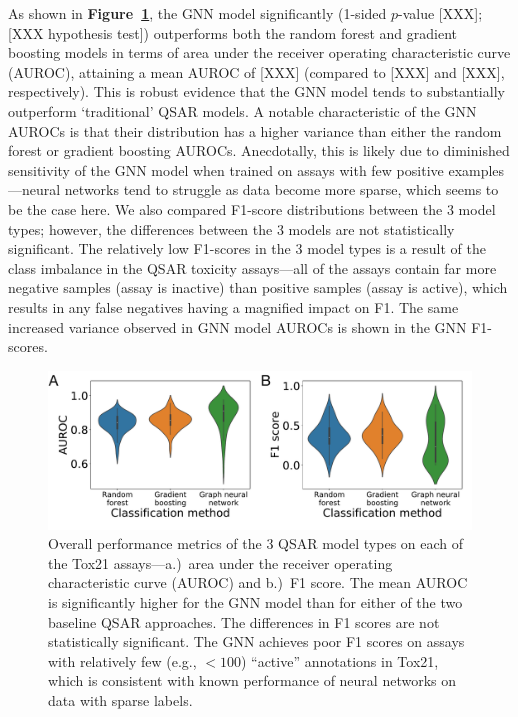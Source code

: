 \documentclass{ws-procs11x85}
\begin{document}
As shown in \textbf{Figure~\ref{fig:3}}, the GNN model significantly (1-sided $p$-value [XXX]; [XXX hypothesis test]) outperforms both the random forest and gradient boosting models in terms of area under the receiver operating characteristic curve (AUROC), attaining a mean AUROC of [XXX] (compared to [XXX] and [XXX], respectively).
This is robust evidence that the GNN model tends to substantially outperform `traditional' QSAR models.
A notable characteristic of the GNN AUROCs is that their distribution has a higher variance than either the random forest or gradient boosting AUROCs.
Anecdotally, this is likely due to diminished sensitivity of the GNN model when trained on assays with few positive examples---neural networks tend to struggle as data become more sparse, which seems to be the case here.
We also compared F1-score distributions between the 3 model types; however, the differences between the 3 models are not statistically significant.
The relatively low F1-scores in the 3 model types is a result of the class imbalance in the QSAR toxicity assays---all of the assays contain far more negative samples (assay is inactive) than positive samples (assay is active), which results in any false negatives having a magnified impact on F1.
The same increased variance observed in GNN model AUROCs is shown in the GNN F1-scores.

\begin{figure}
   \centering
   \includegraphics[width=\textwidth]{figures/figure2.pdf}
   \caption{Overall performance metrics of the 3 QSAR model types on each of the Tox21 assays---a.)~area under the receiver operating characteristic curve (AUROC) and b.)~F1 score. The mean AUROC is significantly higher for the GNN model than for either of the two baseline QSAR approaches. The differences in F1 scores are not statistically significant. The GNN achieves poor F1 scores on assays with relatively few (e.g., $< 100$) ``active'' annotations in Tox21, which is consistent with known performance of neural networks on data with sparse labels.}\label{fig:3}
\end{figure}
\end{document}
